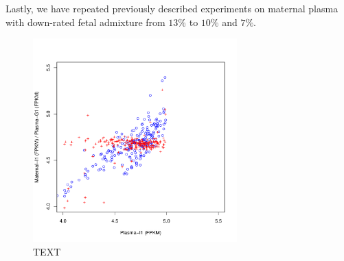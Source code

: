 Lastly, we have repeated previously described experiments on maternal plasma with down-rated fetal admixture from $13\%$ to $10\%$ and $7\%$.


\begin{figure}[h]
\center\includegraphics[width = 0.7\textwidth]{figures/fpkm}
\caption{TEXT}\label{fig:fpkm}
\end{figure}





